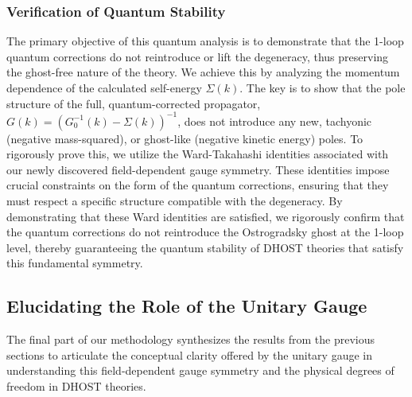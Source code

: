 \documentclass[twocolumn]{aastex631}
\begin{document}
\subsubsection{Verification of Quantum Stability}
The primary objective of this quantum analysis is to demonstrate that the 1-loop quantum corrections do not reintroduce or lift the degeneracy, thus preserving the ghost-free nature of the theory. We achieve this by analyzing the momentum dependence of the calculated self-energy $\Sigma(k)$. The key is to show that the pole structure of the full, quantum-corrected propagator, $G(k) = (G_0^{-1}(k) - \Sigma(k))^{-1}$, does not introduce any new, tachyonic (negative mass-squared), or ghost-like (negative kinetic energy) poles. To rigorously prove this, we utilize the Ward-Takahashi identities associated with our newly discovered field-dependent gauge symmetry. These identities impose crucial constraints on the form of the quantum corrections, ensuring that they must respect a specific structure compatible with the degeneracy. By demonstrating that these Ward identities are satisfied, we rigorously confirm that the quantum corrections do not reintroduce the Ostrogradsky ghost at the 1-loop level, thereby guaranteeing the quantum stability of DHOST theories that satisfy this fundamental symmetry.

\subsection{Elucidating the Role of the Unitary Gauge}

The final part of our methodology synthesizes the results from the previous sections to articulate the conceptual clarity offered by the unitary gauge in understanding this field-dependent gauge symmetry and the physical degrees of freedom in DHOST theories.
\end{document}
